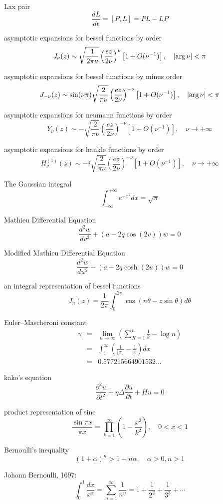 Lax pair 
$$
\frac{dL}{dt}=[P,L]=PL-LP
$$


asymptotic expansions for bessel functions by order
$$
J_\nu(z) \sim \sqrt{\frac{1}{2\pi\nu}}\left(\frac{ez}{2\nu}\right)^\nu\left[1+O(\nu^{-1})\right], \quad |{\rm arg}\, \nu|<\pi
$$

asymptotic expansions for bessel functions by minus order
$$
J_{-\nu}(z) \sim \sin(\nu\pi)\sqrt{\frac{2}{\pi\nu}}\left(\frac{ez}{2\nu}\right)^{-\nu}\left[1+O(\nu^{-1})\right], \quad |{\rm arg}\, \nu|<\pi
$$

asymptotic expansions for neumann functions by order
$$
Y_{\nu}(z) \sim -\sqrt{\frac{2}{\pi\nu}}\left(\frac{ez}{2\nu}\right)^{-\nu}\left[1+O(\nu^{-1})\right], \quad \nu\rightarrow+\infty
$$


asymptotic expansions for hankle functions by order
$$
H^{(1)}_{\nu}(z) \sim -i\sqrt{\frac{2}{\pi\nu}}\left(\frac{ez}{2\nu}\right)^{-\nu}\left[1+O(\nu^{-1})\right], \quad \nu\rightarrow+\infty
$$

The Gaussian integral 
$$
\displaystyle \int^{+\infty}_{-\infty}e^{-x^2}dx=\sqrt{\pi}
$$


Mathieu Differential Equation
$$
\frac{d^2 w}{d v^2}+(a-2q \cos(2v))w=0
$$


Modified Mathieu Differential Equation
$$
\frac{d^2 w}{d u^2}-(a-2q \cosh(2u))w=0
$$


an integral representation of bessel functions
$$
J_n(z)=\frac{1}{2\pi}\int^{2\pi}_0\cos(n\theta-z\sin\theta)d\theta
$$


Euler–Mascheroni constant
$$
\begin{array}{lll}
\gamma &=& \displaystyle\lim_{n\rightarrow\infty}\left(\sum^n_{K=1}\frac{1}{k}-\log n\right) \\
&=& \displaystyle \int^\infty_1\left(\frac{1}{\lfloor x \rfloor}-\frac{1}{x}\right)dx \\
&=& \displaystyle 0.577215664901532\ldots
\end{array}
$$

kako’s equation
$$
\frac{\partial^2 u}{\partial t^2}+\eta\Delta\frac{\partial u}{\partial t}+H u=0
$$

product representation of sine
$$
\frac{\sin\pi x}{\pi x}=\displaystyle \prod^\infty_{k=1}\left(1-\frac{x^2}{k^2}\right), \quad 0<x<1
$$

Bernoulli’s inequality
$$
(1+\alpha)^n>1+n\alpha, \quad \alpha>0, n>1
$$

Johann Bernoulli, 1697:
$$
\int^1_0 \frac{dx}{x^x}=\sum^\infty_{n=1}\frac{1}{n^n}=1+\frac{1}{2^2}+\frac{1}{3^3}+\cdots
$$

